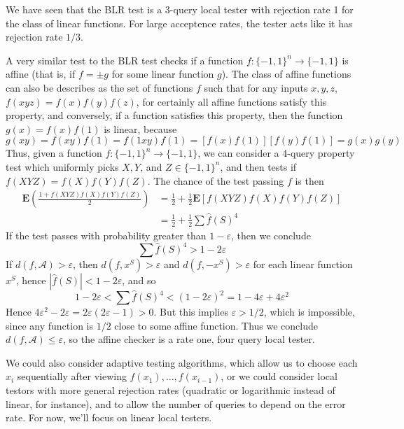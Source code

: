 \begin{example}
    We have seen that the BLR test is a 3-query local tester with rejection rate 1 for the class of linear functions. For large acceptence rates, the tester acts like it has rejection rate $1/3$.
\end{example}

\begin{example}
    A very similar test to the BLR test checks if a function $f: \{ -1, 1 \}^n \to \{ -1, 1 \}$ is affine (that is, if $f = \pm g$ for some linear function $g$). The class of affine functions can also be describes as the set of functions $f$ such that for any inputs $x,y,z$, $f(xyz) = f(x)f(y)f(z)$, for certainly all affine functions satisfy this property, and conversely, if a function satisfies this property, then the function $g(x) = f(x) f(1)$ is linear, because
    \[ g(xy) = f(xy) f(1) = f(1xy) f(1) = [f(x) f(1)] [f(y) f(1)] = g(x) g(y) \]
    Thus, given a function $f: \{ -1, 1 \}^n \to \{ -1, 1 \}$, we can consider a 4-query property test which uniformly picks $X,Y$, and $Z \in \{ -1, 1 \}^n$, and then tests if $f(XYZ) = f(X)f(Y)f(Z)$. The chance of the test passing $f$ is then
    \begin{align*}
        \mathbf{E} \left( \frac{1 + f(XYZ) f(X) f(Y) f(Z)}{2} \right) &= \frac{1}{2} + \frac{1}{2} \mathbf{E}[f(XYZ) f(X) f(Y) f(Z)]\\
        &= \frac{1}{2} + \frac{1}{2} \sum \widehat{f}(S)^4
    \end{align*}
    If the test passes with probability greater than $1 - \varepsilon$, then we conclude
    \[ \sum \widehat{f}(S)^4 > 1 - 2 \varepsilon \]
    If $d(f,\mathcal{A}) > \varepsilon$, then $d(f,x^S) > \varepsilon$ and $d(f,-x^S) > \varepsilon$ for each linear function $x^S$, hence $|\widehat{f}(S)| < 1 - 2 \varepsilon$, and so
    \[ 1 - 2 \varepsilon < \sum \widehat{f}(S)^4 < (1 - 2 \varepsilon)^2 = 1 - 4 \varepsilon + 4 \varepsilon^2 \]
    Hence $4 \varepsilon^2 - 2 \varepsilon = 2\varepsilon(2\varepsilon - 1) > 0$. But this implies $\varepsilon > 1/2$, which is impossible, since any function is $1/2$ close to some affine function. Thus we conclude $d(f,\mathcal{A}) \leq \varepsilon$, so the affine checker is a rate one, four query local tester.
\end{example}

We could also consider adaptive testing algorithms, which allow us to choose each $x_i$ sequentially after viewing $f(x_1), \dots, f(x_{i-1})$, or we could consider local testors with more general rejection rates (quadratic or logarithmic instead of linear, for instance), and to allow the number of queries to depend on the error rate. For now, we'll focus on linear local testers.

